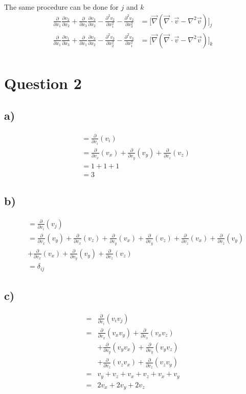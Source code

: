 \documentclass[paper=a4, fontsize=12pt]{scrartcl}
\begin{document}
The same procedure can be done for $j$ and $k$ 
\begin{align*}
\frac{\partial}{\partial x_1}\frac{\partial v_2}{\partial x_2} 
+ \frac{\partial}{\partial x_3}\frac{\partial v_3}{\partial x_2} 
- \frac{\partial ^2 v_2}{\partial x_1^2} 
-\frac{\partial^2 v_2}{\partial x_3^2} 
&= \big[\vec{\nabla}(\vec{\nabla} \cdot \vec{v} - \nabla^2 \vec{v})\big]_j\\
\frac{\partial}{\partial x_1}\frac{\partial v_1}{\partial x_3} 
+ \frac{\partial}{\partial x_1}\frac{\partial v_3}{\partial x_2} 
- \frac{\partial ^2 v_3}{\partial x_2^2} 
-\frac{\partial^2 v_3}{\partial x_1^2} 
&= \big[\vec{\nabla}(\vec{\nabla} \cdot \vec{v} - \nabla^2 \vec{v})\big]_k\\
\end{align*}


\section*{Question 2}
\subsection*{a)}
\begin{align*}
&=\frac{\partial}{\partial v_i}(v_i)\\
&= 
	\frac{\partial}{\partial v_x}(v_x) 
	+ \frac{\partial}{\partial v_y}(v_y)    
	+ \frac{\partial}{\partial v_z}(v_z)\\
& = 
	1 
	+ 1
	+ 1\\
& = 3	
\end{align*}	
\subsection*{b)}
\begin{align*}
&=\frac{\partial}{\partial v_i}(v_j)\\
&= 
\frac{\partial}{\partial v_x}(v_y) 
+ \frac{\partial}{\partial v_x}(v_z)    
+ \frac{\partial}{\partial v_y}(v_x)
+ \frac{\partial}{\partial v_y}(v_z)
+ \frac{\partial}{\partial v_z}(v_x)
+ \frac{\partial}{\partial v_z}(v_y)\\
&+ \frac{\partial}{\partial v_x} (v_x) 
+ \frac{\partial}{\partial v_y} (v_y) 
+ \frac{\partial}{\partial v_z} (v_z) 
\\
&= \delta _{ij}
\end{align*}

\subsection*{c)}
\begin{align*}
=&\frac{\partial}{\partial v_i}(v_i v_j)\\
= &
\frac{\partial}{\partial v_x}(v_x v_y) + \frac{\partial}{\partial v_x}(v_x v_z)\\
&+ \frac{\partial}{\partial v_y}(v_y v_x) + \frac{\partial}{\partial v_y}(v_y v_z)  \\   
&+ \frac{\partial}{\partial v_z}(v_z v_x) + \frac{\partial}{\partial v_z}(v_z v_y)\\
= & v_y + v_z + v_x + v_z + v_x + v_y\\
= & 2v_x + 2v_y + 2v_z
\end{align*}
\end{document}
